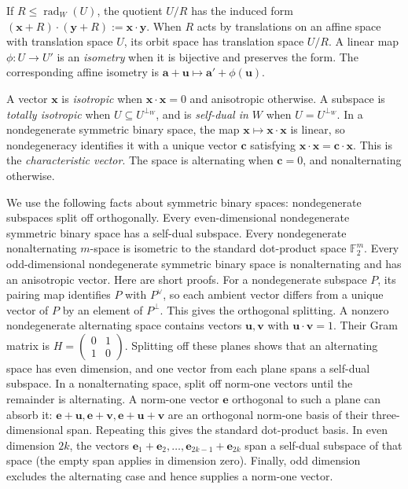 \documentclass[11pt,letterpaper,onecolumn]{article}
\theoremstyle{plain}
\theoremstyle{definition}
\theoremstyle{remark}
\newcommand{\Ftwo}{\mathbb F_2}
\begin{document}
If \(R\le\operatorname{rad}_W(U)\), the quotient \(U/R\) has the induced
form \(({\mathbf{x}}+R)\cdot({\mathbf{y}}+R):={\mathbf{x}}\cdot {\mathbf{y}}\).  When \(R\) acts by translations on an affine space with
translation space \(U\), its orbit space has translation space \(U/R\).
A linear map \(\phi:U\to U'\) is an \emph{isometry} when it is bijective and
preserves the form. The corresponding affine isometry is
\({\mathbf{a}}+{\mathbf{u}}\mapsto {\mathbf{a}}'+\phi({\mathbf{u}})\).

A vector \({\mathbf{x}}\) is \emph{isotropic} when \({\mathbf{x}}\cdot {\mathbf{x}}=0\) and anisotropic
otherwise.  A subspace is \emph{totally isotropic} when
\(U\subseteq U^{\perp_W}\), and is \emph{self-dual in \(W\)} when
\(U=U^{\perp_W}\).  In a nondegenerate symmetric binary space, the map
\({\mathbf{x}}\mapsto {\mathbf{x}}\cdot {\mathbf{x}}\) is linear, so nondegeneracy identifies it with a
unique vector \({\mathbf{c}}\) satisfying \({\mathbf{x}}\cdot {\mathbf{x}}={\mathbf{c}}\cdot {\mathbf{x}}\). This is the
\emph{characteristic vector}.  The space is alternating when \({\mathbf{c}}=0\), and
nonalternating otherwise.

We use the following facts about symmetric binary spaces:
nondegenerate subspaces split off orthogonally. Every even-dimensional
nondegenerate symmetric binary space has a self-dual subspace. Every
nondegenerate nonalternating \(m\)-space is isometric to the standard
dot-product space \(\Ftwo^m\). Every odd-dimensional nondegenerate
symmetric binary space is nonalternating and has an anisotropic vector.  Here are short proofs.  For a nondegenerate subspace
\(P\), its pairing map identifies \(P\) with \(P^\vee\), so each ambient
vector differs from a unique vector of \(P\) by an element of \(P^\perp\).
This gives the orthogonal splitting.  A nonzero nondegenerate alternating
space contains vectors \({\mathbf{u}},{\mathbf{v}}\) with \({\mathbf{u}}\cdot {\mathbf{v}}=1\). Their Gram matrix is
\(H=\left(\begin{smallmatrix}0&1\\1&0\end{smallmatrix}\right)\).
Splitting off these planes shows that an alternating space has even
dimension, and one vector from each plane spans a self-dual subspace.
In a nonalternating space, split off norm-one vectors until the remainder
is alternating.  A norm-one vector \({\mathbf{e}}\) orthogonal to such a plane can
absorb it: \({\mathbf{e}}+{\mathbf{u}},{\mathbf{e}}+{\mathbf{v}},{\mathbf{e}}+{\mathbf{u}}+{\mathbf{v}}\) are an orthogonal norm-one basis of their
three-dimensional span.  Repeating this gives the standard dot-product
basis.  In even dimension \(2k\), the vectors
\({\mathbf{e}}_1+{\mathbf{e}}_2,\ldots,{\mathbf{e}}_{2k-1}+{\mathbf{e}}_{2k}\) span a self-dual subspace of that
space (the empty span applies in dimension zero).  Finally, odd dimension
excludes the alternating case and hence supplies a norm-one vector.
\end{document}
